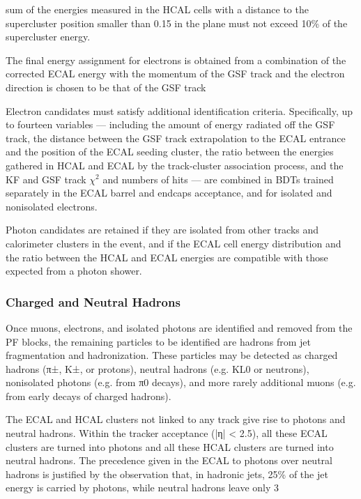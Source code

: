sum of the energies measured in the HCAL cells with a distance to the supercluster position smaller than 0.15 in the \etaphi plane must not exceed 10\% of the supercluster energy.

The final energy assignment for electrons is obtained from a combination of the corrected ECAL energy with the momentum of the GSF track and the electron direction is chosen to be that of the GSF track

Electron candidates must satisfy additional identification criteria. Specifically, up to fourteen variables — including the amount of energy radiated off the GSF track, the distance between the GSF track extrapolation to the ECAL entrance and the position of the ECAL seeding cluster, the ratio between the energies gathered in HCAL and ECAL by the track-cluster association process, and the KF and GSF track $\chi^2$ and numbers of hits — are combined in BDTs trained separately in the ECAL barrel and endcaps acceptance, and for isolated and nonisolated electrons.

Photon candidates are retained if they are isolated from other tracks and calorimeter clusters in the event, and if the ECAL cell energy distribution and the ratio between the HCAL and ECAL energies are compatible with those expected from a photon shower.



\subsubsection{Charged and Neutral Hadrons}

Once muons, electrons, and isolated photons are identified and removed from the PF blocks, the remaining particles to be identified are hadrons from jet fragmentation and hadronization. These particles may be detected as charged hadrons (π±, K±, or protons), neutral hadrons (e.g. KL0 or neutrons), nonisolated photons (e.g. from π0 decays), and more rarely additional muons (e.g. from early decays of charged hadrons).

The ECAL and HCAL clusters not linked to any track give rise to photons and neutral hadrons. Within the tracker acceptance (|η| < 2.5), all these ECAL clusters are turned into photons and all these HCAL clusters are turned into neutral hadrons. The precedence given in the ECAL to photons over neutral hadrons is justified by the observation that, in hadronic jets, 25\% of the jet energy is carried by photons, while neutral hadrons leave only 3%

